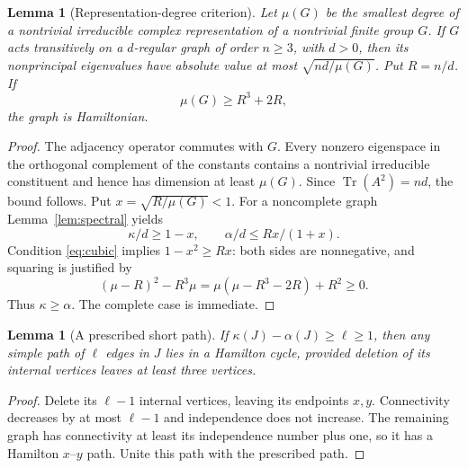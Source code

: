 \documentclass[11pt]{article}
\newtheorem{lemma}[theorem]{Lemma}
\theoremstyle{definition}
\newcommand{\Tr}{\operatorname{Tr}}
\begin{document}
\begin{lemma}[Representation-degree criterion]\label{lem:multiplicity}
Let $\mu(G)$ be the smallest degree of a nontrivial irreducible complex representation of a nontrivial finite group $G$. If $G$ acts transitively on a $d$-regular graph of order $n\ge3$, with $d>0$, then its nonprincipal eigenvalues have absolute value at most $\sqrt{nd/\mu(G)}$. Put $R=n/d$. If
\begin{equation}\label{eq:cubic}
\mu(G)\ge R^3+2R,
\end{equation}
the graph is Hamiltonian.
\end{lemma}
\begin{proof}
The adjacency operator commutes with $G$. Every nonzero eigenspace in the orthogonal complement of the constants contains a nontrivial irreducible constituent and hence has dimension at least $\mu(G)$. Since $\Tr(A^2)=nd$, the bound follows. Put $x=\sqrt{R/\mu(G)}<1$. For a noncomplete graph Lemma~\ref{lem:spectral} yields
\[
\kappa/d\ge1-x,\qquad \alpha/d\le Rx/(1+x).
\]
Condition \eqref{eq:cubic} implies $1-x^2\ge Rx$: both sides are nonnegative, and squaring is justified by
\[
(\mu-R)^2-R^3\mu=\mu(\mu-R^3-2R)+R^2\ge0.
\]
Thus $\kappa\ge\alpha$. The complete case is immediate.
\end{proof}

\begin{lemma}[A prescribed short path]\label{lem:path}
If $\kappa(J)-\alpha(J)\ge\ell\ge1$, then any simple path of $\ell$ edges in $J$ lies in a Hamilton cycle, provided deletion of its internal vertices leaves at least three vertices.
\end{lemma}
\begin{proof}
Delete its $\ell-1$ internal vertices, leaving its endpoints $x,y$. Connectivity decreases by at most $\ell-1$ and independence does not increase. The remaining graph has connectivity at least its independence number plus one, so it has a Hamilton $x$--$y$ path. Unite this path with the prescribed path.
\end{proof}
\end{document}
